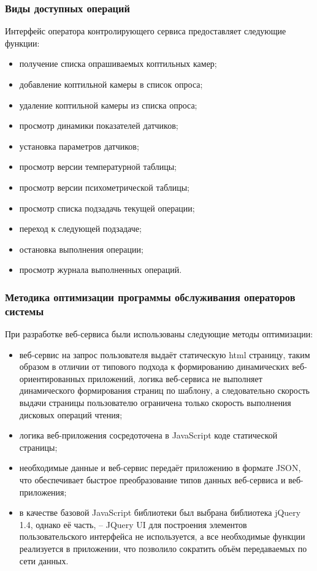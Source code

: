 \subsubsection{Виды доступных операций}
Интерфейс оператора контролирующего сервиса предоставляет следующие функции:
\begin{itemize}
	\item получение списка опрашиваемых коптильных камер;
	\item добавление коптильной камеры в список опроса;
	\item удаление коптильной камеры из списка опроса;
	\item просмотр динамики показателей датчиков;
	\item установка параметров датчиков;
	\item просмотр версии температурной таблицы;
	\item просмотр версии психометрической таблицы;
	\item просмотр списка подзадачь текущей операции;
	\item переход к следующей подзадаче;
	\item остановка выполнения операции;
	\item просмотр журнала выполненных операций.
\end{itemize}

\subsubsection{Методика оптимизации программы обслуживания операторов системы}
При разработке веб-сервиса были использованы следующие методы оптимизации:
\begin{itemize}
	\item веб-сервис на запрос пользователя выдаёт статическую html страницу, таким образом
		в отличии от типового подхода к формированию динамических веб-ориентированных приложений,
		логика веб-сервиса не выполняет динамического формирования страниц по шаблону, а следовательно
		скорость выдачи страницы пользователю ограничена только скорость выполнения дисковых операций чтения;
	\item логика веб-приложения сосредоточена в JavaScript коде статической страницы;
	\item необходимые данные и веб-сервис передаёт приложению в формате JSON,
	что обеспечивает быстрое преобразование типов данных веб-сервиса и веб-приложения;
	\item в качестве базовой JavaScript библиотеки был выбрана библиотека jQuery 1.4, однако её часть, -- JQuery UI
	для построения элементов пользовательского интерфейса не используется, а все необходимые функции реализуется
	в приложении, что позволило сократить объём передаваемых по сети данных.
\end{itemize}


